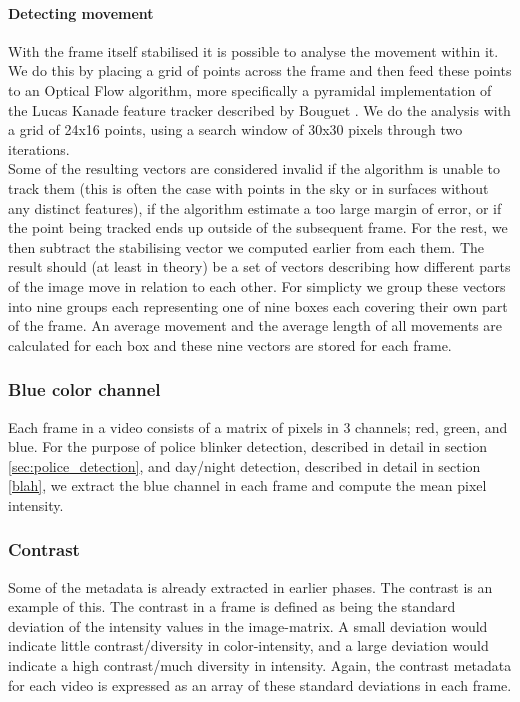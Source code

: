 \paragraph{Detecting movement}
%
With the frame itself stabilised it is possible to analyse the movement within it. We do this by placing a grid of points across the frame and then feed these points to an Optical Flow algorithm, more specifically a pyramidal implementation of the Lucas Kanade feature tracker described by Bouguet \cite{Bouguet2000}. We do the analysis with a grid of 24x16 points, using a search window of 30x30 pixels through two iterations.\\%
Some of the resulting vectors are considered invalid if the algorithm is unable to track them (this is often the case with points in the sky or in surfaces without any distinct features), if the algorithm estimate a too large margin of error, or if the point being tracked ends up outside of the subsequent frame. For the rest, we then subtract the stabilising vector we computed earlier from each them. The result should (at least in theory) be a set of vectors describing how different parts of the image move in relation to each other. For simplicty we group these vectors into nine groups each representing one of nine boxes each covering their own part of the frame.
%
%
An average movement and the average length of all movements are calculated for each box and these nine vectors are stored for each frame.
%
%
\subsubsection{Blue color channel}\label{sec:blue_channel}
%
Each frame in a video consists of a matrix of pixels in 3 channels; red, green, and blue. For the purpose of police blinker detection, described in detail in section \ref{sec:police_detection}, and day/night detection, described in detail in section \ref{blah}, we extract the blue channel in each frame and compute the mean pixel intensity.
%
\subsubsection{Contrast}
%
Some of the metadata is already extracted in earlier phases. The contrast is an example of this. The contrast in a frame is defined as being the standard deviation of the intensity values in the image-matrix. A small deviation would indicate little contrast/diversity in color-intensity, and a large deviation would indicate a high contrast/much diversity in intensity. Again, the contrast metadata for each video is expressed as an array of these standard deviations in each frame.
%
